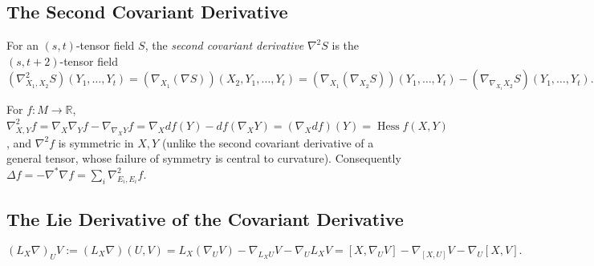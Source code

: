 \subsection{The Second Covariant Derivative}

\begin{definition}
  \label{def:pet-ch2-second-covariant-derivative}
  \leanok
  For an $(s,t)$-tensor field $S$, the \emph{second covariant derivative}
  $\nabla^2S$ is the $(s,t+2)$-tensor field
  \[
    (\nabla^2_{X_1,X_2}S)(Y_1,\dots,Y_t)
    = (\nabla_{X_1}(\nabla S))(X_2,Y_1,\dots,Y_t)
    = (\nabla_{X_1}(\nabla_{X_2}S))(Y_1,\dots,Y_t)-(\nabla_{\nabla_{X_1}X_2}S)(Y_1,\dots,Y_t).
  \]
\end{definition}

\begin{remark}
  \label{rem:pet-ch2-hessian-second-covariant-derivative}
  \leanok
  For $f:M\to\mathbb{R}$, $\nabla^2_{X,Y}f=\nabla_X\nabla_Yf-\nabla_{\nabla_XY}f
  =\nabla_Xdf(Y)-df(\nabla_XY)=(\nabla_Xdf)(Y)=\operatorname{Hess}f(X,Y)$, and
  $\nabla^2f$ is symmetric in $X,Y$ (unlike the second covariant derivative of
  a general tensor, whose failure of symmetry is central to curvature).
  Consequently $\Delta f=-\nabla^*\nabla f=\sum_i\nabla^2_{E_i,E_i}f$.
\end{remark}

\subsection{The Lie Derivative of the Covariant Derivative}

\begin{definition}
  \label{def:pet-ch2-lie-derivative-connection}
  \leanok
  \[
    (L_X\nabla)_UV := (L_X\nabla)(U,V)
    = L_X(\nabla_UV)-\nabla_{L_XU}V-\nabla_UL_XV
    = [X,\nabla_UV]-\nabla_{[X,U]}V-\nabla_U[X,V].
  \]
\end{definition}

